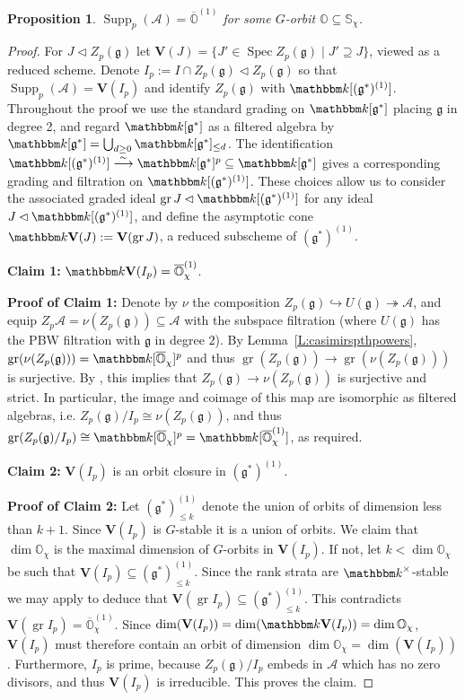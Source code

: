 \documentclass[twoside,12pt,reqno]{amsart}
\newtheorem{Proposition}[Theorem]{Proposition}
\theoremstyle{remark}
\numberwithin{equation}{section}
\def\isoto{\overset{\sim}{\longrightarrow}}
\def\k{{\mathbbm k}}
\def\gr{\operatorname{gr}}
\def\Spec{\operatorname{Spec}}
\def\Supp{\operatorname{Supp}}
\def\o{\overline}
\def\O{{\mathbb O}}
\def\bbS{\mathbb{S}}
\def\bbV{\mathbf{V}}
\def\g{{\mathfrak g}}
\def\cA{\mathcal{A}}
\newcommand{\A}{\mathcal{A}}
\begin{document}
\begin{Proposition}
\label{P:psupport}
    $\Supp_p(\A) = \overline{\O}^{(1)}$ for some $G$-orbit $\O \subseteq \bbS_\chi$. 
\end{Proposition}
\begin{proof}

For $J \lhd Z_p(\g)$ let $\bbV(J) = \{ J' \in \Spec Z_p(\g) \mid J' \supseteq J\}$, viewed as a reduced scheme. 
Denote $I_p:=I\cap Z_p(\g)\lhd Z_p(\g)$
so that $\Supp_p(\A) = \bbV(I_p)$
and identify $Z_p(\g)$ with $\k[(\g^*)^{(1)}]$. 
Throughout the proof we use the standard grading on $\k[\g^*]$ placing $\g$ in degree 2, and regard $\k[\g^*]$ as a filtered algebra by $\k[\g^*] = \bigcup_{d \ge 0} \k[\g^*]_{\le d}$. 
The identification $\k[(\g^*)^{(1)}]\isoto \k[\g^*]^p\subseteq \k[\g^*]$ gives a corresponding grading and filtration on $\k[(\g^*)^{(1)}]$. These choices allow us to consider the associated graded ideal $\gr J \lhd \k[(\g^*)^{(1)}]$ for any ideal $J \lhd \k[(\g^*)^{(1)}]$, and define the asymptotic cone $\k \bbV(J) := \bbV(\gr J)$, a reduced subscheme of $(\g^*)^{(1)}$.

{\bf Claim 1:} $\k \bbV(I_p)=\o{\O}_\chi^{(1)}$.

{\bf Proof of Claim 1:} 
Denote by $\nu$ the composition $Z_p(\g)\hookrightarrow U(\g)\twoheadrightarrow \cA$, and equip $Z_p\cA=\nu(Z_p(\g))\subseteq \cA$ with the subspace filtration (where $U(\g)$ has the PBW filtration with $\g$ in degree $2$). By Lemma~\ref{L:casimirspthpowers}, $\gr(\nu(Z_p(\g)))=\k[\o{\O}_\chi]^p$ and thus $\gr(Z_p(\g))\to\gr(\nu(Z_p(\g)))$ is surjective. By \cite[Corollary 6.14]{MR}, this implies that $Z_p(\g)\to \nu(Z_p(\g))$ is surjective and strict. In particular, the image and coimage of this map are isomorphic as filtered algebras, i.e. $Z_p(\g)/I_p\cong \nu(Z_p(\g))$, and thus $\gr(Z_p(\g)/I_p)\cong \k[\o{\O}_\chi]^p=\k[\o\O_\chi^{(1)}]$, as required.

{\bf Claim 2:} $\bbV(I_p)$ is an orbit closure in $(\g^*)^{(1)}$.

{\bf Proof of Claim 2:} Let $(\g^*)^{(1)}_{\leq k}$ denote the union of orbits of dimension less than $k+1$. 
Since $\bbV(I_p)$ is $G$-stable it is a union of orbits. 
We claim that $\dim\O_\chi$ is the maximal dimension of $G$-orbits in $\bbV(I_p)$. 
If not, let $k<\dim\O_\chi$ be such that $\bbV(I_p)\subseteq (\g^*)^{(1)}_{\leq k}$. 
Since the rank strata are $\k^\times$-stable we may apply \cite[5.3(4), (5)]{PrST} to deduce that $\bbV(\gr I_p) \subseteq (\g^*)^{(1)}_{\leq k}$. 
This contradicts $\bbV(\gr I_p) = \o\O_\chi^{(1)}$. Since $\dim(\bbV(I_p))=\dim(\k \bbV(I_p))=\dim\O_\chi$, 
$\bbV(I_p)$ must therefore contain an orbit of dimension $\dim\O_\chi=\dim(\bbV(I_p))$. 
Furthermore, $I_p$ is prime, because $Z_p(\g)/I_p$ embeds in $\A$ which has no zero divisors, and thus $\bbV(I_p)$ is irreducible. This proves the claim.


\end{proof}
\end{document}
